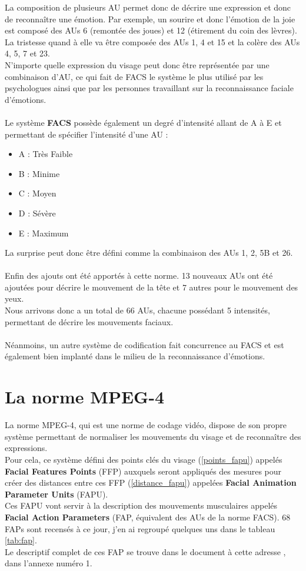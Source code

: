 \documentclass[overfullbox, poster]{polytech/polytech}
\begin{document}
La composition de plusieurs AU permet donc de décrire une expression et donc de reconnaître une émotion. Par exemple, un sourire et donc l'émotion de la joie est composé des AUs 6 (remontée des joues) et 12 (étirement du coin des lèvres).\\
La tristesse quand à elle va être composée des AUs 1, 4 et 15 et la colère des AUs 4, 5, 7 et 23.\\
N'importe quelle expression du visage peut donc être représentée par une combinaison d'AU, ce qui fait de FACS le système le plus utilisé par les psychologues ainsi que par les personnes travaillant sur la reconnaissance faciale d'émotions.\\
\\
Le système \textbf{FACS} possède également un degré d'intensité allant de A à E et permettant de spécifier l'intensité d'une AU :
\begin{itemize}
	\item A : Très Faible
	\item B : Minime
	\item C : Moyen
	\item D : Sévère
	\item E : Maximum
\end{itemize}
La surprise peut donc être défini comme la combinaison des AUs 1, 2, 5B et 26.\\
\\
Enfin des ajouts ont été apportés à cette norme. 13 nouveaux AUs ont été ajoutées pour décrire le mouvement de la tête et 7 autres pour le mouvement des yeux.\\
Nous arrivons donc a un total de 66 AUs, chacune possédant 5 intensités, permettant de décrire les mouvements faciaux.\\
\\
Néanmoins, un autre système de codification fait concurrence au FACS et est également bien implanté dans le milieu de la reconnaissance d'émotions.

\section{La norme MPEG-4}
\label{sec:fapu}

La norme MPEG-4, qui est une norme de codage vidéo, dispose de son propre système permettant de normaliser les mouvements du visage et de reconnaître des expressions.\\
Pour cela, ce système défini des points clés du visage (\autoref{points_fapu}) appelés \textbf{Facial Features Points} (FFP) auxquels seront appliqués des mesures pour créer des distances entre ces FFP (\autoref{distance_fapu}) appelées \textbf{Facial Animation Parameter Units} (FAPU).\\
Ces FAPU vont servir à la description des mouvements musculaires appelés \textbf{Facial Action Parameters} (FAP, équivalent des AUs de la norme FACS). 68 FAPs sont recensés à ce jour, j'en ai regroupé quelques uns dans le tableau \autoref{tab:fap}.\\
Le descriptif complet de ces FAP se trouve dans le document à cette adresse \cite{urlfaps}, dans l'annexe numéro 1.
\end{document}
